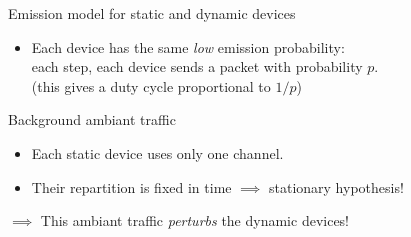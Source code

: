 \begin{frameO}[Hypotheses ($1/2$)]

    \begin{colorblock}{Emission model for static and dynamic devices}

        \begin{itemize}
            \item
                  Each device has the same \emph{low} emission probability: \\
                  each step, each device sends a packet with probability \(p\).
                  \\
                  \hfill{}\small{(this gives a duty cycle proportional to $1/p$)}
        \end{itemize}

    \end{colorblock}

    \vspace*{20pt}

    \begin{lightblock}{Background ambiant traffic}

        \begin{itemize}
            \item
                  Each static device uses only one channel.
            \item
                  Their repartition is fixed in time \hfill{} $\implies$ \alert{stationary} hypothesis!
        \end{itemize}

        \(\implies\) This ambiant traffic \emph{perturbs} the dynamic devices!
    \end{lightblock}

\end{frameO}

